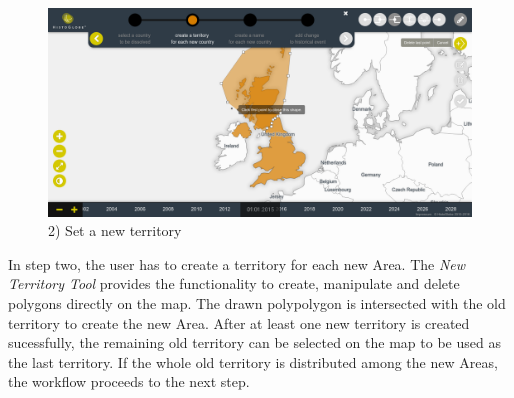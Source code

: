 \begin{minipage}[t]{0.47\textwidth}

  \begin{figure}[H]
    \centering
    \includegraphics[width=1.0\textwidth]{graphics/development/final_interface/4_set_new_territories.png}
    \caption{2) Set a new territory}
    \label{fig:final_4_set_new_territories}
  \end{figure}

  In step two, the user has to create a territory for each new Area. The \emph{New Territory Tool} provides the functionality to create, manipulate and delete polygons directly on the map. The drawn polypolygon is intersected with the old territory to create the new Area. After at least one new territory is created sucessfully, the remaining old territory can be selected on the map to be used as the last territory. If the whole old territory is distributed among the new Areas, the workflow proceeds to the next step.

\end{minipage}

